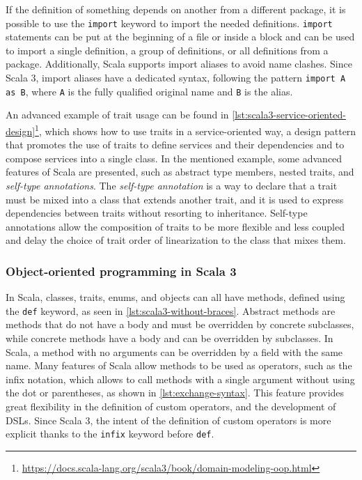 If the definition of something depends on another from a different package, it is possible to use the \texttt{import} keyword to import the needed definitions.
%
\texttt{import} statements can be put at the beginning of a file or inside a block and can be used to import a single definition, a group of definitions, or all definitions from a package.
%
Additionally, Scala supports import aliases to avoid name clashes.
%
Since Scala 3, import aliases have a dedicated syntax, following the pattern \texttt{import A as B}, where \texttt{A} is the fully qualified original name and \texttt{B} is the alias.

An advanced example of trait usage can be found in \cref{lst:scala3-service-oriented-design}\footnote{\url{https://docs.scala-lang.org/scala3/book/domain-modeling-oop.html}}, which shows how to use traits in a service-oriented way, a design pattern that promotes the use of traits to define services and their dependencies and to compose services into a single class\cite{service-oriented-design}.
%
In the mentioned example, some advanced features of Scala are presented, such as abstract type members, nested traits, and \textit{self-type annotations}.
%
The \textit{self-type annotation} is a way to declare that a trait must be mixed into a class that extends another trait, and it is used to express dependencies between traits without resorting to inheritance.
%
Self-type annotations allow the composition of traits to be more flexible and less coupled and delay the choice of trait order of linearization to the class that mixes them.



\subsubsection{Object-oriented programming in Scala 3}

In Scala, classes, traits, enums, and objects can all have methods, defined using the \texttt{def} keyword, as seen in \cref{lst:scala3-without-braces}.
%
Abstract methods are methods that do not have a body and must be overridden by concrete subclasses, while concrete methods have a body and can be overridden by subclasses.
%
In Scala, a method with no arguments can be overridden by a field with the same name.
%
Many features of Scala allow methods to be used as operators, such as the infix notation, which allows to call methods with a single argument without using the dot or parentheses, as shown in \cref{lst:exchange-syntax}.
%
This feature provides great flexibility in the definition of custom operators, and the development of \ac{DSL}s.
%
Since Scala 3, the intent of the definition of custom operators is more explicit thanks to the \texttt{infix} keyword before \texttt{def}.

